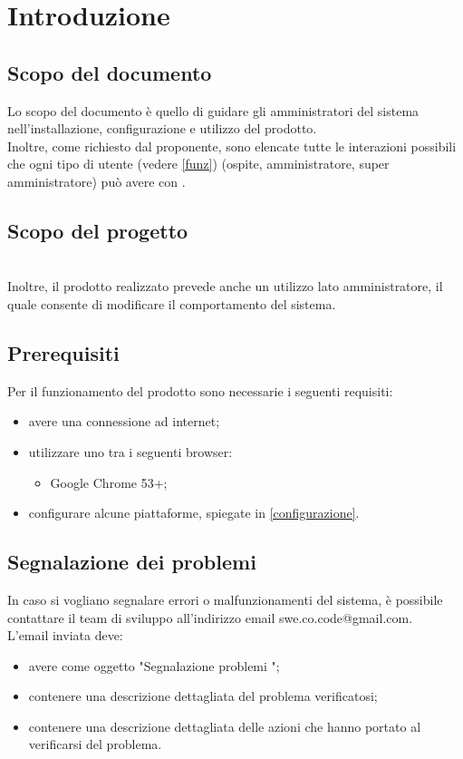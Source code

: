 \section{Introduzione}
\subsection{Scopo del documento}
Lo scopo del documento è quello di guidare gli amministratori del sistema nell'installazione, configurazione e utilizzo del prodotto.\\
Inoltre, come richiesto dal proponente, sono elencate tutte le interazioni possibili che ogni tipo di utente (vedere \ref{funz}) (ospite, amministratore, super amministratore) può avere con \PROGETTO.\\
\subsection{Scopo del progetto}
\SCOPO\\
Inoltre, il prodotto realizzato prevede anche un utilizzo lato amministratore, il quale consente di modificare il comportamento del sistema.
\subsection{Prerequisiti}
Per il funzionamento del prodotto sono necessarie i seguenti requisiti:
\begin{itemize}
	\item avere una connessione ad internet;
	\item utilizzare uno tra i seguenti browser:
	\begin{itemize}
		\item Google Chrome 53+;
	\end{itemize}
	\item configurare alcune piattaforme, spiegate in \ref{configurazione}.
\end{itemize}
\subsection{Segnalazione dei problemi}
In caso si vogliano segnalare errori o malfunzionamenti del sistema, è possibile contattare il team di sviluppo \GRUPPO{} all'indirizzo email swe.co.code@gmail.com. \\
L'email inviata deve:
\begin{itemize}
	\item avere come oggetto "Segnalazione problemi \PROGETTO";
	\item contenere una descrizione dettagliata del problema verificatosi;
	\item contenere una descrizione dettagliata delle azioni che hanno portato al verificarsi del problema.
\end{itemize}